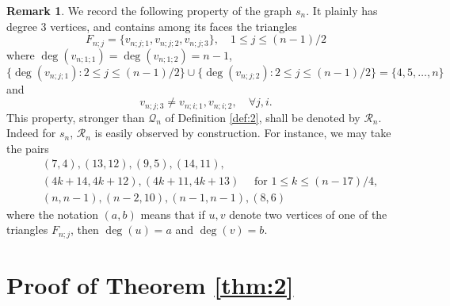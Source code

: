 \documentclass[11pt]{article}
\theoremstyle{definition}
\newtheorem{rem}[thm]{Remark}
\numberwithin{equation}{section}
\def\calQ{\mathcal{Q}}
\def\calR{\mathcal{R}}
\begin{document}
\begin{rem}
\label{rem:ap}
We record the following property of the graph $s_n$. It plainly has degree $3$ vertices, and contains among its faces the triangles
\begin{equation}
\label{eqn:faces2}
F_{n;j}=\{v_{n;j;1}, v_{n;j;2}, v_{n;j;3}\}, \quad 1\leq j\leq(n-1)/2
\end{equation}
where $\deg(v_{n;1;1})=\deg(v_{n;1;2})=n-1$,
\[\{\deg(v_{n;j;1}) : 2\leq j\leq(n-1)/2\} \cup \{\deg(v_{n;j;2}) : 2\leq j\leq(n-1)/2\}=\{4,5,\dots,n\}\]
and
\[v_{n;j;3}\neq v_{n;i;1},v_{n;i;2},  \quad\forall j,i.\]
This property, stronger than $\calQ_n$ of Definition \ref{def:2}, shall be denoted by $\calR_n$. Indeed for $s_n$, $\calR_n$ is easily observed by construction. For instance, we may take the pairs
\begin{align*}
&(7,4), (13,12), (9,5), (14,11), \\&(4k+14,4k+12), (4k+11,4k+13) \quad \text{ for } 1\leq k\leq(n-17)/4, \\&(n,n-1), (n-2,10), (n-1,n-1), (8,6)
\end{align*}
where the notation $(a,b)$ means that if $u,v$ denote two vertices of one of the triangles $F_{n;j}$, then $\deg(u)=a$ and $\deg(v)=b$. 
\end{rem}


\section{Proof of Theorem \ref{thm:2}}
\label{sec:ind}
\end{document}
